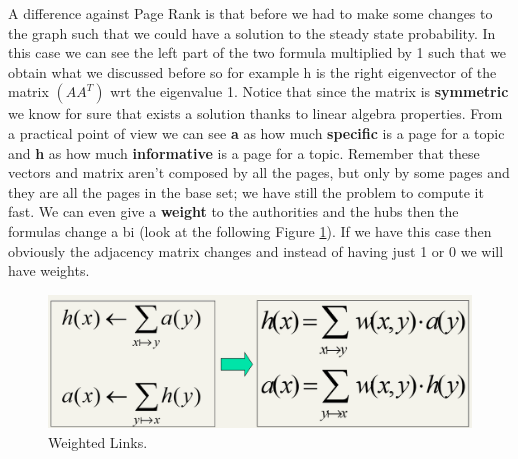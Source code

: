 A difference against Page Rank is that before we had to make some changes to the graph such that we could have a solution to the steady state probability. In this case we can see the left part of the two formula multiplied by 1 such that we obtain what we discussed before so for example h is the right eigenvector of the matrix $(AA^T)$ wrt the eigenvalue 1. Notice that since the matrix is \textbf{symmetric} we know for sure that exists a solution thanks to linear algebra properties.\newline
From a practical point of view we can see \textbf{a} as how much \textbf{specific} is a page for a topic and \textbf{h} as how much \textbf{informative} is a page for a topic.\newline
Remember that these vectors and matrix aren't composed by all the pages, but only by some pages and they are all the pages in the base set; we have still the problem to compute it fast.\newline
We can even give a \textbf{weight} to the authorities and the hubs then the formulas change a bi (look at the following Figure \ref{fig:weightedauthorities}). If we have this case then obviously the adjacency matrix changes and instead of having just 1 or 0 we will have weights.\newline
\begin{figure}
    \centering
    \includegraphics[width=0.75\linewidth]{images/weightedauthorities.PNG}
    \caption{Weighted Links.}
    \label{fig:weightedauthorities}
\end{figure}
